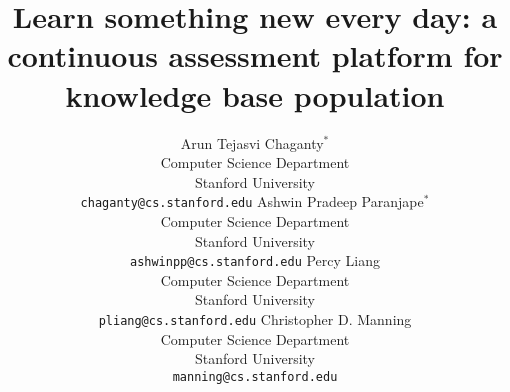 \documentclass[11pt]{article}
\title{Learn something new every day: a continuous assessment platform for knowledge base population}
\author{%
  Arun Tejasvi Chaganty$^*$ \\
  Computer Science Department \\
  Stanford University \\
  {\tt chaganty@cs.stanford.edu}
\And%
  Ashwin Pradeep Paranjape$^*$ \\
  Computer Science Department \\
  Stanford University \\
  {\tt ashwinpp@cs.stanford.edu}
\And%
  Percy Liang \\
  Computer Science Department \\
  Stanford University \\
  {\tt pliang@cs.stanford.edu}
\And%
  Christopher D. Manning \\
  Computer Science Department \\
  Stanford University \\
  {\tt manning@cs.stanford.edu}
}
\date{}
\begin{document}
\maketitle

\begin{abstract}

\end{abstract}












\end{document}
